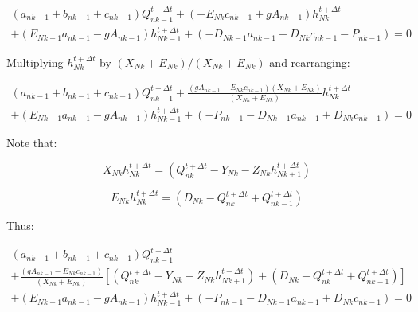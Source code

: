 \documentclass[11pt]{article}
\begin{document}
\begin{equation}
  \begin{split}
    (a_{nk - 1} + b_{nk - 1} + c_{nk - 1})  Q_{nk - 1}^{t + \Delta t} + ( - E_{Nk} c_{nk - 1} + g A_{nk - 1}) h_{Nk}^{t + \Delta t} \\ + (E_{Nk - 1} a_{nk - 1} - g A_{nk -1}) h_{Nk - 1}^{t + \Delta t}   
    + (- D_{Nk - 1} a_{nk - 1}   + D_{Nk} c_{nk - 1} - P_{nk - 1}) = 0 
  \end{split}
\end{equation}

Multiplying $h_{Nk}^{t + \Delta t}$ by $(X_{Nk} + E_{Nk}) / (X_{Nk} + E_{Nk})$
and rearranging:

\begin{equation}
  \begin{split}
    (a_{nk - 1} + b_{nk - 1} + c_{nk - 1})  Q_{nk - 1}^{t + \Delta t} + \frac{( g A_{nk - 1} - E_{Nk} c_{nk - 1} ) (X_{Nk} + E_{Nk}) }{(X_{Nk} + E_{Nk})} h_{Nk}^{t + \Delta t} \\ + (E_{Nk - 1} a_{nk - 1} - g A_{nk -1}) h_{Nk - 1}^{t + \Delta t}   
    + ( - P_{nk - 1} - D_{Nk - 1} a_{nk - 1}   + D_{Nk} c_{nk - 1} ) = 0 
  \end{split}
\end{equation}

Note that:

\begin{equation}
X_{Nk} h_{Nk}^{t + \Delta t} = (Q_{nk}^{t + \Delta t} - Y_{Nk} - Z_{Nk}
h_{Nk + 1}^{t + \Delta t})
\end{equation}

\begin{equation}
E_{Nk} h_{Nk}^{t + \Delta t} = (D_{Nk} -
Q_{nk}^{t + \Delta t} + Q_{nk - 1}^{t + \Delta t})
\end{equation}

Thus:

\begin{equation}
  \begin{split}
    (a_{nk - 1} + b_{nk - 1} + c_{nk - 1})  Q_{nk - 1}^{t + \Delta t} \\ + \frac{( g A_{nk - 1} - E_{Nk} c_{nk - 1} )}{(X_{Nk} + E_{Nk})} [(Q_{nk}^{t + \Delta t} - Y_{Nk} - Z_{Nk} h_{Nk + 1}^{t + \Delta t}) + (D_{Nk} - Q_{nk}^{t + \Delta t} + Q_{nk - 1}^{t + \Delta t})] \\ + (E_{Nk - 1} a_{nk - 1} - g A_{nk -1}) h_{Nk - 1}^{t + \Delta t}   
    + ( - P_{nk - 1} - D_{Nk - 1} a_{nk - 1}   + D_{Nk} c_{nk - 1} ) = 0 
  \end{split}
\end{equation}
\end{document}
